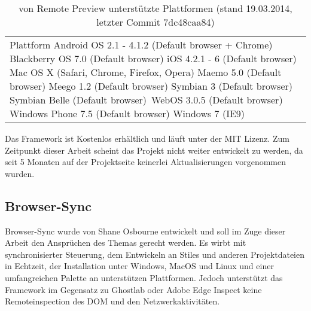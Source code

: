 \documentclass[13pt,a4paper,oneside]{scrbook} %
\newcommand{\mi}[1]{\index{#1}#1}
\renewcommand{\\}{\bigskip}
\begin{document}
	\begin{table}[H]
 		\centering
			\begin{tabular}{| p{13cm} |}
			
			\hline
				Plattform\\
			\hline
			\hline
				Android OS 2.1 - 4.1.2 (Default browser + Chrome)\\
				Blackberry OS 7.0 (Default browser)\\
				iOS 4.2.1 - 6 (Default browser)\\
				Mac OS X (Safari, Chrome, Firefox, Opera)\\
				Maemo 5.0 (Default browser)\\
				Meego 1.2 (Default browser)\\
				Symbian 3 (Default browser)\\
				Symbian Belle (Default browser)\
				WebOS 3.0.5 (Default browser)\\
				Windows Phone 7.5 (Default browser)\\	
				Windows 7 (IE9)\\
				\hline
				\end{tabular}
			\caption{von Remote Preview unterstützte Plattformen (stand 19.03.2014, letzter Commit 7dc48caa84)}
	\end{table}
	Das Framework ist Kostenlos erhältlich und läuft unter der MIT Lizenz. Zum Zeitpunkt dieser Arbeit scheint das Projekt nicht 		weiter entwickelt zu werden, da seit 5 Monaten auf der Projektseite keinerlei Aktualisierungen vorgenommen wurden.

		
	\subsection{\mi{Browser-Sync}}
	Browser-Sync wurde von Shane Osbourne entwickelt und soll im Zuge dieser Arbeit den Ansprüchen des Themas gerecht werden. Es wirbt mit synchronisierter Steuerung, dem Entwickeln an Stiles und anderen Projektdateien in Echtzeit, der Installation unter Windows, MacOS und Linux und einer umfangreichen Palette an unterstützen Plattformen. Jedoch unterstützt das Framework im Gegensatz zu Ghostlab oder Adobe Edge Inspect keine Remoteinspection des DOM und den Netzwerkaktivitäten.
	
\end{document}
